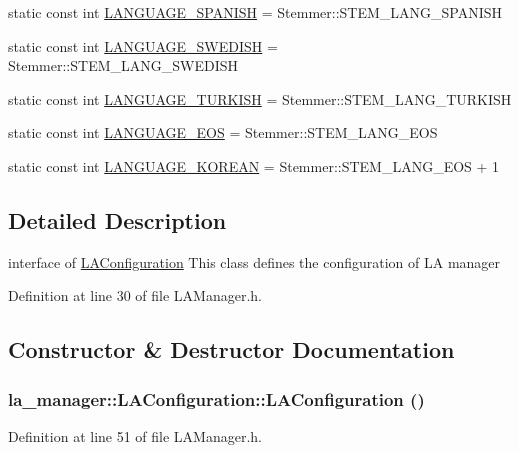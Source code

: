 \begin{CompactItemize}
\item 
static const int \hyperlink{classla__manager_1_1LAConfiguration_cba69eb692010c894d4b3932c02ffe00}{LANGUAGE\_\-SPANISH} = Stemmer::STEM\_\-LANG\_\-SPANISH
\item 
static const int \hyperlink{classla__manager_1_1LAConfiguration_a72891063ae53484e3c962dbf0fd566d}{LANGUAGE\_\-SWEDISH} = Stemmer::STEM\_\-LANG\_\-SWEDISH
\item 
static const int \hyperlink{classla__manager_1_1LAConfiguration_3584d8a2504d4aa80ed208aac9b64943}{LANGUAGE\_\-TURKISH} = Stemmer::STEM\_\-LANG\_\-TURKISH
\item 
static const int \hyperlink{classla__manager_1_1LAConfiguration_139bdfd5b3dac7170cbc9c5df132c6dc}{LANGUAGE\_\-EOS} = Stemmer::STEM\_\-LANG\_\-EOS
\item 
static const int \hyperlink{classla__manager_1_1LAConfiguration_e9be58e2f82a87896be78b364ad61f88}{LANGUAGE\_\-KOREAN} = Stemmer::STEM\_\-LANG\_\-EOS + 1
\end{CompactItemize}


\subsection{Detailed Description}
interface of \hyperlink{classla__manager_1_1LAConfiguration}{LAConfiguration} This class defines the configuration of LA manager 

Definition at line 30 of file LAManager.h.

\subsection{Constructor \& Destructor Documentation}
\hypertarget{classla__manager_1_1LAConfiguration_87843181ddb38cbed89ca0c5bce1dbb6}{
\subsubsection[{LAConfiguration}]{\setlength{\rightskip}{0pt plus 5cm}la\_\-manager::LAConfiguration::LAConfiguration ()}}
\label{classla__manager_1_1LAConfiguration_87843181ddb38cbed89ca0c5bce1dbb6}




Definition at line 51 of file LAManager.h.

